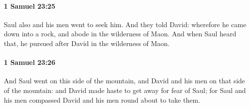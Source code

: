 		\paragraph{1 Samuel 23:25} %
			\label{1SAMUEL-23-25}

			Saul also and his men went to seek him. And they told David: wherefore he came down into a rock, and abode in the wilderness of Maon. And when Saul heard that, he pursued after David in the wilderness of Maon.


		\paragraph{1 Samuel 23:26} %
			\label{1SAMUEL-23-26}

			And Saul went on this side of the mountain, and David and his men on that side of the mountain: and David made haste to get away for fear of Saul; for Saul and his men compassed David and his men round about to take them.

